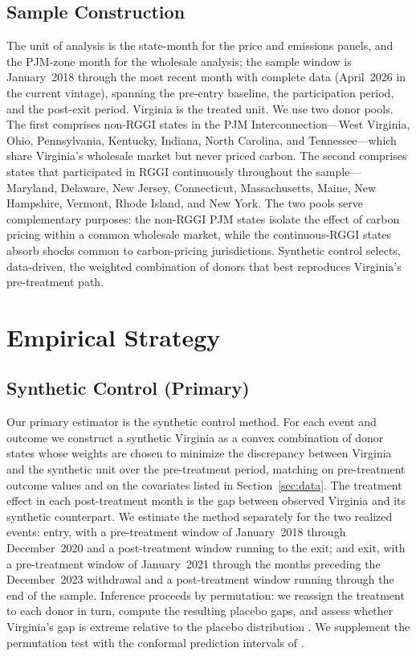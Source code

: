 \documentclass[12pt]{article}
\begin{document}

\subsection{Sample Construction}\label{sec:sample}
The unit of analysis is the state-month for the price and emissions panels, and the PJM-zone
month for the wholesale analysis; the sample window is January~2018 through the most recent
month with complete data (April~2026 in the current vintage), spanning the pre-entry
baseline, the participation period, and the post-exit period. Virginia is the
treated unit. We use two donor pools. The first comprises non-RGGI states in the PJM
Interconnection---West Virginia, Ohio, Pennsylvania, Kentucky, Indiana, North Carolina, and
Tennessee---which share Virginia's wholesale market but never priced carbon. The second
comprises states that participated in RGGI continuously throughout the sample---Maryland,
Delaware, New Jersey, Connecticut, Massachusetts, Maine, New Hampshire, Vermont, Rhode Island,
and New York. The two pools serve complementary purposes: the non-RGGI PJM states isolate the
effect of carbon pricing within a common wholesale market, while the continuous-RGGI states
absorb shocks common to carbon-pricing jurisdictions. Synthetic control selects, data-driven,
the weighted combination of donors that best reproduces Virginia's pre-treatment path.

\section{Empirical Strategy}\label{sec:strategy}

\subsection{Synthetic Control (Primary)}\label{sec:scm}
Our primary estimator is the synthetic control method. For each event and outcome we construct
a synthetic Virginia as a convex combination of donor states whose weights are chosen to
minimize the discrepancy between Virginia and the synthetic unit over the pre-treatment period,
matching on pre-treatment outcome values and on the covariates listed in
Section~\ref{sec:data}. The treatment effect in each post-treatment month is the gap between
observed Virginia and its synthetic counterpart. We estimate the method separately for the two
realized events: entry, with a pre-treatment window of January~2018 through December~2020 and a
post-treatment window running to the exit; and exit, with a pre-treatment window of
January~2021 through the months preceding the December~2023 withdrawal and a post-treatment
window running through the end of the sample. Inference proceeds by permutation: we reassign
the treatment to each donor in turn, compute the resulting placebo gaps, and assess whether
Virginia's gap is extreme relative to the placebo distribution
\citep{Abadie2010_synth,Abadie2021_using_synth}. We supplement the permutation test with the
conformal prediction intervals of \citet{Cattaneo2021_prediction}.
\end{document}

